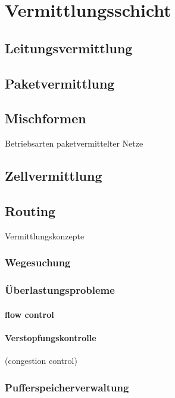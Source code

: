 \chapter{Vermittlungsschicht}
\section{Leitungsvermittlung}
\section{Paketvermittlung}
\section{Mischformen}
Betriebsarten paketvermittelter Netze
\section{Zellvermittlung}
\section{Routing}
Vermittlungskonzepte
\subsection{Wegesuchung}
\subsection{Überlastungsprobleme}
\subsubsection{flow control}
\subsubsection{Verstopfungskontrolle}
(congestion control)
\subsection{Pufferspeicherverwaltung}


